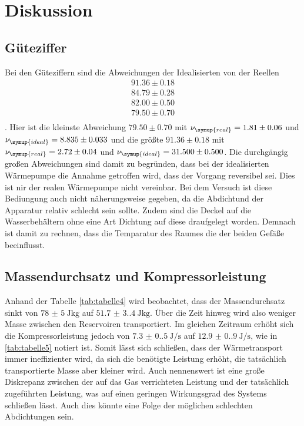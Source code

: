 \section{Diskussion}
\label{sec:Diskussion}

\subsection{Güteziffer}
Bei den Güteziffern sind die Abweichungen der Idealisierten von der Reellen 
\begin{gather*}
    91.36    \pm   0.18\\
    84.79    \pm   0.28\\
    82.00    \pm   0.50\\
    79.50    \pm   0.70\\
\end{gather*}
.
Hier ist die kleinste Abweichung $79.50    \pm   0.70$ mit $\nu_{\symup{real}}=1.81\pm   0.06 $   und     $\nu_{\symup{ideal}}=8.835    \pm   0.033$
und die größte $91.36    \pm   0.18$ mit $\nu_{\symup{real}}=2.72   \pm   0.04  $ und $   \nu_{\symup{ideal}}=31.500    \pm  0.500 $. 
Die durchgängig großen Abweichungen sind damit zu begründen, dass bei der idealisierten Wärmepumpe die Annahme getroffen wird, dass der Vorgang reversibel sei.
Dies ist nir der realen Wärmepumpe nicht vereinbar.
Bei dem Versuch ist diese Bediungung auch nicht näherungsweise gegeben, da die Abdichtund der Apparatur relativ schlecht sein sollte.
Zudem sind die Deckel auf die Wasserbehältern ohne eine Art Dichtung auf diese draufgelegt worden. 
Demnach ist damit zu rechnen, dass die Temparatur des Raumes die der beiden Gefäße beeinflusst.

\subsection{Massendurchsatz und Kompressorleistung}

Anhand der Tabelle \ref{tab:tabelle4} wird beobachtet, dass der Massendurchsatz sinkt von $\qty{78(5)}{\joule\kilo\gram}$ auf
$\qty{51.7(3.4)}{\joule\kilo\gram}$. Über die Zeit hinweg wird also weniger Masse zwischen den Reservoiren transportiert.
Im gleichen Zeitraum erhöht sich die Kompressorleistung jedoch von $\qty{7.3(0.5)}{\joule\per\second}$ auf $\qty{12.9(0.9)}{\joule\per\second}$, wie in 
\ref{tab:tabelle5} notiert ist. Somit lässt sich schließen, dass der Wärmetransport immer ineffizienter wird, da sich die
benötigte Leistung erhöht, die tatsächlich transportierte Masse aber kleiner wird. Auch nennenswert ist eine große Diskrepanz
zwischen der auf das Gas verrichteten Leistung und der tatsächlich zugeführten Leistung, was auf einen geringen 
Wirkungsgrad des Systems schließen lässt.
Auch dies könnte eine Folge der möglichen schlechten Abdichtungen sein.


